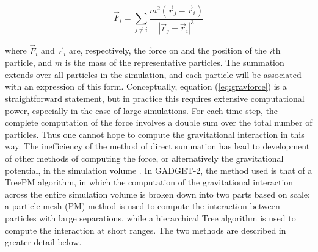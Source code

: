 \documentclass[10pt,letterpaper,final]{iopart}
\numberwithin{equation}{subsection}
\def\ni{\noindent}
\begin{document}
\begin{equation}\label{eq:gravforce}
\vec{F}_i = \sum_{j \neq i} \frac{m^2 \left(\vec{r}_j - \vec{r}_i\right)}{\left | \vec{r}_j - \vec{r}_i \right |^3 } 
\end{equation}

\ni where $\vec{F}_i$ and $\vec{r}_i$ are, respectively, the force on and the position of the $i$th particle, and $m$ is the mass of the representative particles. The summation extends over all particles in the simulation, and each particle will be associated with an expression of this form. Conceptually, equation (\ref{eq:gravforce}) is a straightforward statement, but in practice this requires extensive computational power, especially in the case of large simulations. For each time step, the complete computation of the force involves a double sum over the total number of particles. Thus one cannot hope to compute the gravitational interaction in this way. The inefficiency of the method of direct summation has lead to development of other methods of computing the force, or alternatively the gravitational potential, in the simulation volume \cite{Schneider}\cite{Bernardeau}\cite{Gadget1}.  In GADGET-2, the method used is that of a TreePM algorithm, in which the computation of the gravitational interaction across the entire simulation volume is broken down into two parts based on scale: a particle-mesh (PM) method is used to compute the interaction between particles with large separations, while a hierarchical Tree algorithm is used to compute the interaction at short ranges. The two methods are described in greater detail below. 
\end{document}
